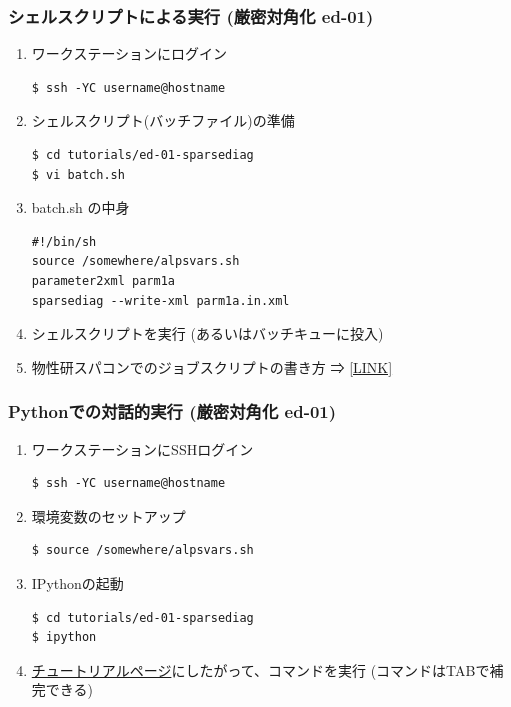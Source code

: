 \begin{frame}[t,fragile]
  \frametitle{シェルスクリプトによる実行 (厳密対角化 ed-01)}
  \begin{enumerate}
  \item ワークステーションにログイン
\begin{lstlisting}
$ ssh -YC username@hostname
\end{lstlisting}
  \item シェルスクリプト(バッチファイル)の準備
\begin{lstlisting}
$ cd tutorials/ed-01-sparsediag
$ vi batch.sh
\end{lstlisting}
  \item batch.sh の中身
\begin{lstlisting}
#!/bin/sh
source /somewhere/alpsvars.sh
parameter2xml parm1a
sparsediag --write-xml parm1a.in.xml
\end{lstlisting}
  \item シェルスクリプトを実行 (あるいはバッチキューに投入)
  \item 物性研スパコンでのジョブスクリプトの書き方 ⇒ \href{http://www.issp.u-tokyo.ac.jp/supercom/for-users/x92nxz/alps}{[LINK]}
  \end{enumerate}
\end{frame}

\begin{frame}[t,fragile]
  \frametitle{Pythonでの対話的実行 (厳密対角化 ed-01)}
  \begin{enumerate}
  \item ワークステーションにSSHログイン
\begin{lstlisting}
$ ssh -YC username@hostname
\end{lstlisting}
  \item 環境変数のセットアップ
\begin{lstlisting}
$ source /somewhere/alpsvars.sh
\end{lstlisting}
  \item IPythonの起動
\begin{lstlisting}
$ cd tutorials/ed-01-sparsediag
$ ipython
\end{lstlisting}
  \item \href{http://alps.comp-phys.org/mediawiki/index.php/ALPS_2_Tutorials:ED-01_SparseDiagonalization/ja#Python.E3.81.A7.E3.81.AE.E5.AE.9F.E8.A1.8C}{チュートリアルページ}にしたがって、コマンドを実行 (コマンドはTABで補完できる)
  \end{enumerate}
\end{frame}

